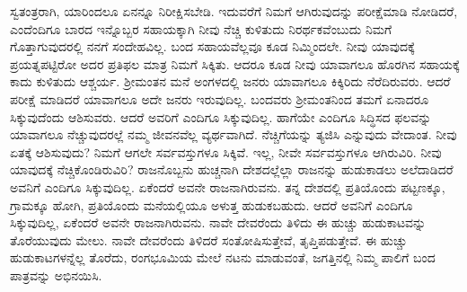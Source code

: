ಸ್ವತಂತ್ರರಾಗಿ, ಯಾರಿಂದಲೂ ಏನನ್ನೂ ನಿರೀಕ್ಷಿಸಬೇಡಿ. ಇದುವರೆಗೆ ನಿಮಗೆ ಆಗಿರುವುದನ್ನು ಪರೀಕ್ಷೆಮಾಡಿ ನೋಡಿದರೆ, ಎಂದೆಂದಿಗೂ ಬಾರದ ಇನ್ನೊಬ್ಬರ ಸಹಾಯಕ್ಕಾಗಿ ನೀವು ನೆಚ್ಚಿ ಕುಳಿತುದು ನಿರರ್ಥಕವೆಂಬುದು ನಿಮಗೆ ಗೊತ್ತಾಗುವುದರಲ್ಲಿ ನನಗೆ ಸಂದೇಹವಿಲ್ಲ. ಬಂದ ಸಹಾಯವೆಲ್ಲವೂ ಕೂಡ ನಿಮ್ಮಿಂದಲೇ. ನೀವು ಯಾವುದಕ್ಕೆ ಪ್ರಯತ್ನಪಟ್ಟಿರೋ ಅದರ ಪ್ರತಿಫಲ ಮಾತ್ರ ನಿಮಗೆ ಸಿಕ್ಕಿತು. ಆದರೂ ಕೂಡ ನೀವು ಯಾವಾಗಲೂ ಹೊರಗಿನ ಸಹಾಯಕ್ಕೆ ಕಾದು ಕುಳಿತುದು ಆಶ್ಚರ್ಯ. ಶ‍್ರೀಮಂತನ ಮನೆ ಅಂಗಳದಲ್ಲಿ ಜನರು ಯಾವಾಗಲೂ ಕಿಕ್ಕಿರಿದು ನೆರೆದಿರುವರು. ಆದರೆ ಪರೀಕ್ಷೆ ಮಾಡಿದರೆ ಯಾವಾಗಲೂ ಅದೇ ಜನರು ಇರುವುದಿಲ್ಲ. ಬಂದವರು ಶ‍್ರೀಮಂತನಿಂದ ತಮಗೆ ಏನಾದರೂ ಸಿಕ್ಕುವುದೆಂದು ಆಶಿಸುವರು. ಆದರೆ ಅವರಿಗೆ ಎಂದಿಗೂ ಸಿಕ್ಕುವುದಿಲ್ಲ. ಹಾಗೆಯೇ ಎಂದಿಗೂ ಸಿದ್ಧಿಸದ ಫಲವನ್ನು ಯಾವಾಗಲೂ ನೆಚ್ಚುವುದರಲ್ಲೆ ನಮ್ಮ ಜೀವನವೆಲ್ಲ ವ್ಯರ್ಥವಾಗಿದೆ. ನೆಚ್ಚಿಗೆಯನ್ನು ತ್ಯಜಿಸಿ ಎನ್ನುವುದು ವೇದಾಂತ. ನೀವು ಏತಕ್ಕೆ ಆಶಿಸುವುದು? ನಿಮಗೆ ಆಗಲೇ ಸರ್ವವಸ್ತುಗಳೂ ಸಿಕ್ಕಿವೆ. ಇಲ್ಲ, ನೀವೇ ಸರ್ವವಸ್ತುಗಳೂ ಆಗಿರುವಿರಿ. ನೀವು ಯಾವುದಕ್ಕೆ ನೆಚ್ಚಿಕೊಂಡಿರುವಿರಿ? ರಾಜನೊಬ್ಬನು ಹುಚ್ಚನಾಗಿ ದೇಶದಲ್ಲೆಲ್ಲಾ ರಾಜನನ್ನು ಹುಡುಕಾಡಲು ಅಲೆದಾಡಿದರೆ ಅವನಿಗೆ ಎಂದಿಗೂ ಸಿಕ್ಕುವುದಿಲ್ಲ. ಏಕೆಂದರೆ ಅವನೇ ರಾಜನಾಗಿರುವನು. ತನ್ನ ದೇಶದಲ್ಲಿ ಪ್ರತಿಯೊಂದು ಪಟ್ಟಣಕ್ಕೂ, ಗ್ರಾಮಕ್ಕೂ ಹೋಗಿ, ಪ್ರತಿಯೊಂದು ಮನೆಯಲ್ಲಿಯೂ ಅಳುತ್ತ ಹುಡುಕಬಹುದು. ಆದರೆ ಅವನಿಗೆ ಎಂದಿಗೂ ಸಿಕ್ಕುವುದಿಲ್ಲ, ಏಕೆಂದರೆ ಅವನೇ ರಾಜನಾಗಿರುವನು. ನಾವೇ ದೇವರೆಂದು ತಿಳಿದು ಈ ಹುಚ್ಚು ಹುಡುಕಾಟವನ್ನು ತೊರೆಯುವುದು ಮೇಲು. ನಾವೇ ದೇವರೆಂದು ತಿಳಿದರೆ ಸಂತೋಷಿಸುತ್ತೇವೆ, ತೃಪ್ತಿಪಡುತ್ತೇವೆ. ಈ ಹುಚ್ಚು ಹುಡುಕಾಟಗಳನ್ನೆಲ್ಲ ತೊರೆದು, ರಂಗಭೂಮಿಯ ಮೇಲೆ ನಟನು ಮಾಡುವಂತೆ, ಜಗತ್ತಿನಲ್ಲಿ ನಿಮ್ಮ ಪಾಲಿಗೆ ಬಂದ ಪಾತ್ರವನ್ನು ಅಭಿನಯಿಸಿ. 

\vskip 6pt

